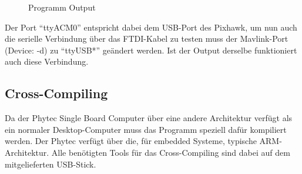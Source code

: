 \documentclass[12pt]{article} %
\begin{document}
	\begin{figure}[H]
		\centering
		\caption{Programm Output}
		\label{2}
	\end{figure}
	\noindent
	Der Port "`ttyACM0"' entspricht dabei dem USB-Port des Pixhawk, um nun auch die serielle Verbindung über das FTDI-Kabel zu testen muss der Mavlink-Port (Device: -d) zu "`ttyUSB*"' geändert werden. Ist der Output derselbe funktioniert auch diese Verbindung.
	
	\subsection{Cross-Compiling}
	
	Da der Phytec Single Board Computer über eine andere Architektur verfügt als ein normaler Desktop-Computer muss das Programm speziell dafür kompiliert werden. Der Phytec verfügt über die, für embedded Systeme, typische ARM-Architektur. Alle benötigten Tools für das Cross-Compiling sind dabei auf dem mitgelieferten USB-Stick.
	
\end{document}
